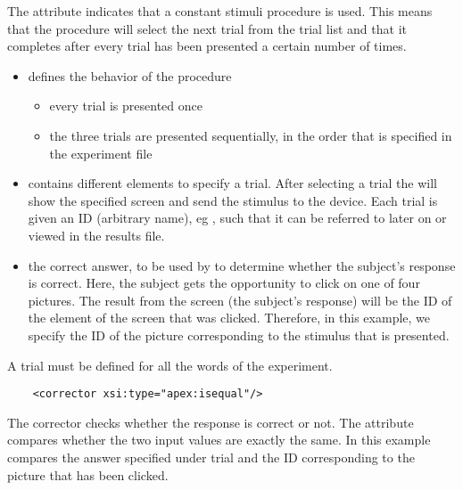 The attribute 
indicates that a constant stimuli procedure is used. This means
that the procedure will select the next trial from the trial list
and that it completes after every trial has been presented a
certain number of times.
\begin{itemize}

\item {} defines the behavior of the procedure
\begin{itemize}

\item {} every trial is presented once

\item {}  the three trials are
presented sequentially, in the order that is specified in the
experiment file
\end{itemize}
 

\item {} contains different  elements
to specify a trial. After selecting a trial the
 will show the specified screen and send the
stimulus to the device. Each trial is given an ID (arbitrary
name), eg , such that it can be referred to later on
or viewed in the results file.

\item {} the correct answer, to be used by \apex to
determine whether the subject's response is correct. Here, the
subject gets the opportunity to click on one of four pictures. The
result from the screen (the subject's response) will be the ID of
the element of the screen that was clicked. Therefore, in this
example, we specify the ID of the picture corresponding to the
stimulus that is presented.
\end{itemize}

A trial must be defined for all the words of the experiment.

   

\begin{lstlisting}
    <corrector xsi:type="apex:isequal"/>
\end{lstlisting}

The corrector checks whether the response is correct or not. The
attribute  compares whether the two
input values are exactly the same. In this example
 compares the answer specified under trial and
the ID corresponding to the picture that has been clicked.


